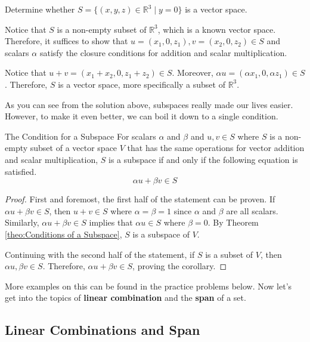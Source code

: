 \documentclass[../main.tex]{subfiles}
\begin{document}
\begin{problem}{}{}
Determine whether $S = \{ (x, y, z) \in \mathbb{R}^3 \mid y = 0 \}$
is a vector space.
\end{problem}
\begin{solution}
Notice that $S$ is a non-empty subset of $\mathbb{R}^3$, which is a
known vector space. Therefore, it suffices to show that $u =
(x_1, 0, z_1), v = (x_2, 0, z_2) \in S$ and scalars $\alpha$ satisfy
the closure conditions for addition and scalar multiplication.

Notice that $u + v = (x_1 + x_2, 0, z_1 + z_2) \in S$. Moreover,
$\alpha u = (\alpha x_1, 0, \alpha z_1) \in S$. Therefore, $S$ is a
vector space, more specifically a subset of $\mathbb{R}^3$.
\end{solution}

As you can see from the solution above, subspaces really made our
lives easier. However, to make it even better, we can boil it down
to a single condition.

\begin{corollary}{}{The Condition for a Subspace}
For scalars $\alpha$ and $\beta$ and $u, v \in S$ where $S$ is a
non-empty subset of a vector space $V$ that has the same operations
for vector addition and scalar multiplication, $S$ is a subspace if
and only if the following equation is satisfied.
\[
\alpha u + \beta v \in S
\]
\end{corollary}
\begin{proof}
First and foremost, the first half of the statement can be proven.
If $\alpha u + \beta v \in S$, then $u + v \in S$ where $\alpha =
\beta = 1$ since $\alpha$ and $\beta$ are all scalars. Similarly,
$\alpha u + \beta v \in S$ implies that $\alpha u \in S$ where
$\beta = 0$. By Theorem \ref{theo:Conditions of a Subspace}, $S$ is a
subspace of $V$.

Continuing with the second half of the statement, if $S$ is a subset
of $V$, then $\alpha u, \beta v \in S$. Therefore, $\alpha u +
\beta v \in S$, proving the corollary.
\end{proof}

More examples on this can be found in the practice problems below.
Now let's get into the topics of \textbf{linear combination} and the
\textbf{span} of a set.

\subsection{Linear Combinations and Span}
\end{document}
